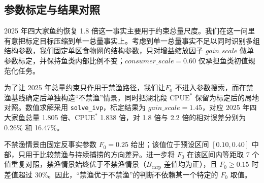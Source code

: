 \subsection{参数标定与结果对照}
2025 年四大家鱼约恢复 1.8 倍这一事实主要用于约束总量尺度。我们在这一问里有意把标定目标压缩到单一总量事实上。考虑到单一总量事实不足以同时识别多组结构参数，我们固定单区食物网的结构参数，只对增益缩放因子 $gain\_scale$ 做单参数标定，并保持鱼类内部比例不变；$consumer\_scale=0.60$ 仅承担鱼类初值规范化任务。

为了让 2025 年总量约束只作用于禁渔路径，我们让$F_0$ 不进入参数搜索，而在禁渔基线确定后单独构造“不禁渔”情景，同时把湖北段 $\mathrm{CPUE}^*$ 保留为标定后的局地对照。数值求解采用 \texttt{solve\_ivp}，标定结果为 $gain\_scale=1.45$，对应 2025 年四大家鱼总量 1.805 倍、$\mathrm{CPUE}^*$ 1.838 倍，对 1.8 倍与 2.2 倍的相对误差分别为 0.26\% 和 16.47\%。

不禁渔情景由固定反事实参数 $F_0=0.25$ 给出；该值位于预设区间 $[0.10,0.40]$ 中部，只用于比较禁渔与持续捕捞的方向差异。进一步将 $F_0$ 在该区间内等距取 7 个值重复对照，禁渔情景始终优于不禁渔情景（$B_{\text{carp}}$ 差值均为正），且 $F_0\ge 0.15$ 时差值超过 30\%。因此，“禁渔优于不禁渔”的判断不依赖某一个特定的 $F_0$ 取值。


